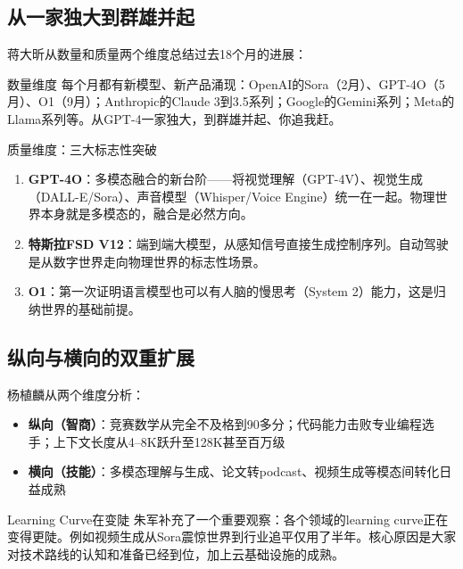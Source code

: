 \documentclass[a4paper]{article}
\begin{document}
\subsection{从一家独大到群雄并起}

蒋大昕从数量和质量两个维度总结过去18个月的进展：

\begin{knowledgebox}{数量维度}
每个月都有新模型、新产品涌现：OpenAI的Sora（2月）、GPT-4O（5月）、O1（9月）；Anthropic的Claude 3到3.5系列；Google的Gemini系列；Meta的Llama系列等。从GPT-4一家独大，到群雄并起、你追我赶。
\end{knowledgebox}

\begin{importantbox}{质量维度：三大标志性突破}
\begin{enumerate}
\item \textbf{GPT-4O}：多模态融合的新台阶——将视觉理解（GPT-4V）、视觉生成（DALL-E/Sora）、声音模型（Whisper/Voice Engine）统一在一起。物理世界本身就是多模态的，融合是必然方向。
\item \textbf{特斯拉FSD V12}：端到端大模型，从感知信号直接生成控制序列。自动驾驶是从数字世界走向物理世界的标志性场景。
\item \textbf{O1}：第一次证明语言模型也可以有人脑的慢思考（System 2）能力，这是归纳世界的基础前提。
\end{enumerate}
\end{importantbox}

\subsection{纵向与横向的双重扩展}

杨植麟从两个维度分析：

\begin{itemize}
\item \textbf{纵向（智商）}：竞赛数学从完全不及格到90多分；代码能力击败专业编程选手；上下文长度从4--8K跃升至128K甚至百万级
\item \textbf{横向（技能）}：多模态理解与生成、论文转podcast、视频生成等模态间转化日益成熟
\end{itemize}

\begin{knowledgebox}{Learning Curve在变陡}
朱军补充了一个重要观察：各个领域的learning curve正在变得更陡。例如视频生成从Sora震惊世界到行业追平仅用了半年。核心原因是大家对技术路线的认知和准备已经到位，加上云基础设施的成熟。
\end{knowledgebox}
\end{document}
